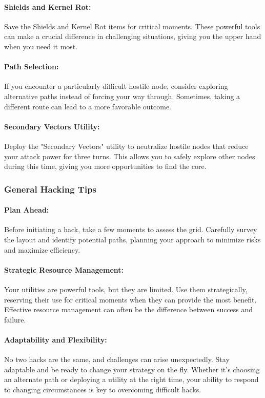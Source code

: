 \documentclass[a4paper,12pt]{article}
\begin{document}
\paragraph{Shields and Kernel Rot:} Save the Shields and Kernel Rot items for critical moments. These powerful tools can make a crucial difference in challenging situations, giving you the upper hand when you need it most.

\paragraph{Path Selection:} If you encounter a particularly difficult hostile node, consider exploring alternative paths instead of forcing your way through. Sometimes, taking a different route can lead to a more favorable outcome.

\paragraph{Secondary Vectors Utility:} Deploy the "Secondary Vectors" utility to neutralize hostile nodes that reduce your attack power for three turns. This allows you to safely explore other nodes during this time, giving you more opportunities to find the core.

\subsubsection{General Hacking Tips}

\paragraph{Plan Ahead:} Before initiating a hack, take a few moments to assess the grid. Carefully survey the layout and identify potential paths, planning your approach to minimize risks and maximize efficiency.

\paragraph{Strategic Resource Management:} Your utilities are powerful tools, but they are limited. Use them strategically, reserving their use for critical moments when they can provide the most benefit. Effective resource management can often be the difference between success and failure.

\paragraph{Adaptability and Flexibility:} No two hacks are the same, and challenges can arise unexpectedly. Stay adaptable and be ready to change your strategy on the fly. Whether it's choosing an alternate path or deploying a utility at the right time, your ability to respond to changing circumstances is key to overcoming difficult hacks.
\end{document}
